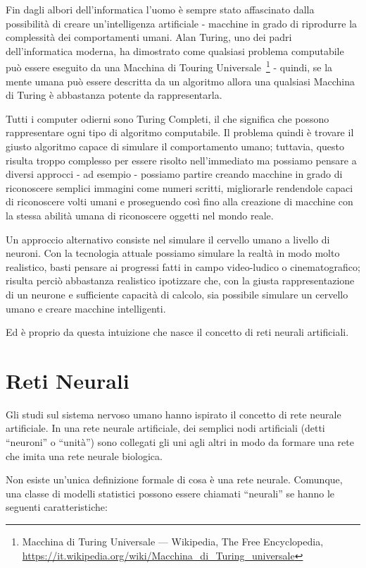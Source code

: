 \nocite{Lipton:2009}
Fin dagli albori dell'informatica l'uomo \`e sempre stato affascinato dalla
possibilit\`a di creare un'intelligenza artificiale - macchine in grado di
riprodurre la complessit\`a dei comportamenti umani. Alan Turing, uno dei padri
dell'informatica moderna, ha dimostrato come qualsiasi problema computabile pu\`o
essere eseguito da una Macchina di Touring Universale~\footnote{Macchina di Turing
Universale --- Wikipedia, The Free Encyclopedia,
\url{https://it.wikipedia.org/wiki/Macchina_di_Turing_universale} } - quindi, se
la mente umana pu\`o essere descritta da un algoritmo allora una qualsiasi Macchina
di Turing \`e abbastanza potente da rappresentarla.

Tutti i computer odierni sono Turing Completi, il che significa che possono
rappresentare ogni tipo di algoritmo computabile. Il problema quindi \`e trovare
il giusto algoritmo capace di simulare il comportamento umano; tuttavia, questo
risulta troppo complesso per essere risolto nell'immediato ma possiamo pensare a
diversi approcci - ad esempio - possiamo partire creando macchine in grado di
riconoscere semplici immagini come numeri scritti, migliorarle rendendole capaci
di riconoscere volti umani e proseguendo cos\`i fino alla creazione di macchine
con la stessa abilit\`a umana di riconoscere oggetti nel mondo reale.

Un approccio alternativo consiste nel simulare il cervello umano a livello di neuroni.
Con la tecnologia attuale possiamo simulare la realt\`a in modo molto realistico,
basti pensare ai progressi fatti in campo video-ludico o cinematografico; risulta
perci\`o abbastanza realistico ipotizzare che, con la giusta rappresentazione di
un neurone e sufficiente capacit\`a di calcolo, sia possibile simulare un cervello
umano e creare macchine intelligenti.

Ed \`e proprio da questa intuizione che nasce il concetto di reti neurali artificiali.

\section{Reti Neurali}

Gli studi sul sistema nervoso umano hanno ispirato il concetto di rete neurale
artificiale. In una rete neurale artificiale, dei semplici nodi artificiali
(detti ``neuroni'' o ``unit\`a'') sono collegati gli uni agli altri in modo da formare
una rete che imita una rete neurale biologica.

Non esiste un'unica definizione formale di cosa \`e una rete neurale.
Comunque, una classe di modelli statistici possono essere chiamati ``neurali'' se
hanno le seguenti caratteristiche:

